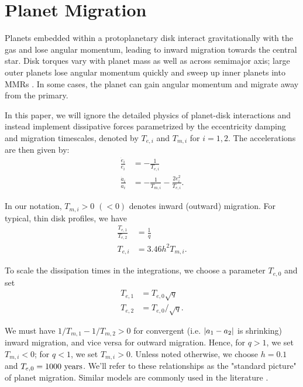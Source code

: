 \documentclass{mnras}
\DeclarePairedDelimiter{\abs}{|}{|}
\begin{document}
\section{Planet Migration}
\label{sec:orgd579a74}
Planets embedded within a protoplanetary disk interact gravitationally
with the gas and lose angular momentum, leading to inward migration
towards the central star.  Disk torques vary with planet mass as well
as across semimajor axis; large outer planets lose angular momentum
quickly and sweep up inner planets into MMRs
\cite{tanaka_three-dimensional_2004,xu_migration_2018}.  In some
cases, the planet can gain angular momentum and migrate away from the
primary.

In this paper, we will ignore the detailed physics of
planet-disk interactions and instead implement dissipative forces
parametrized by the eccentricity damping and migration timescales,
denoted by \(T_{e,i}\) and \(T_{m,i}\) for \(i=1,2\). The accelerations are
then given by:
\begin{align}\label{eq:disforce}
  \frac{\dot{e}_i}{e_i} &= -\frac{1}{T_{e,i}} \\
  \frac{\dot{a}_i}{a_i} &= -\frac{1}{T_{m,i}} -\frac{2e_i^2}{T_{e,i}}.
\end{align}

In our notation, \(T_{m,i}>0\) \((<0)\) denotes inward (outward)
migration.  For typical, thin disk profiles, we have
\cite{tanaka_three-dimensional_2004,cresswell_three-dimensional_2008,xu_migration_2018}
\begin{align}
  \frac{T_{e,1}}{T_{e,2}}&= \frac1q\\
  T_{e,i}&=3.46 h^2 T_{m,i}.
\end{align}

To scale the dissipation times in the integrations, we choose
a parameter \(T_{e,0}\) and set
\begin{align}
  T_{e,1}&=T_{e,0}\sqrt{q}\\
  T_{e,2}&= T_{e,0}/\sqrt{q}.
\end{align}

We must have \(1/T_{m,1} - 1/T_{m,2} > 0\) for convergent
(i.e. \(\abs{a_1-a_2}\) is shrinking) inward migration, and vice versa
for outward migration. Hence, for \(q>1\), we set \(T_{m,i}< 0\); for
\(q<1\), we set \(T_{m,i}>0\).  Unless noted otherwise, we choose \(h=0.1\)
and \(T_{e,0}=1000~\rm{years}\).  We'll refer to these relationships as
the "standard picture" of planet migration. Similar models are
commonly used in the literature
\cite{deck_migration_2015,xu_migration_2018,goldreich_overstable_2014}.
\end{document}
